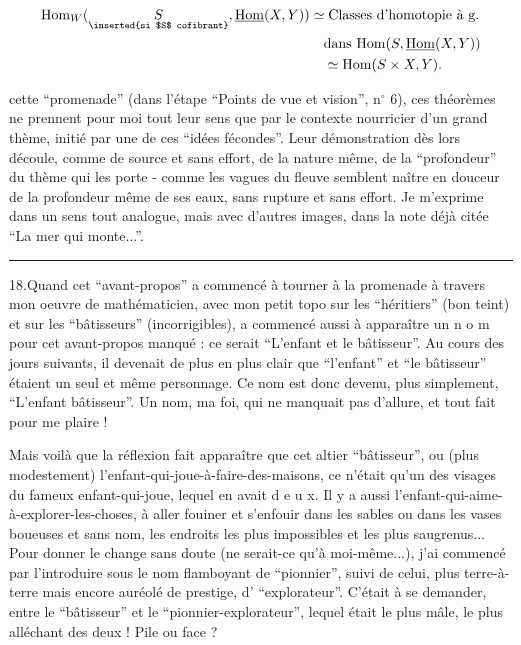 \[
\begin{aligned}
\mathrm{Hom}_W(\underset{\text{\scriptsize\inserted{si $S$ cofibrant}}}{S},\underline{\mathrm{Hom}}(X,Y))
 &\simeq \text{Classes d'homotopie à g.}\\
 &\quad\text{dans }\mathrm{Hom}(S,\underline{\mathrm{Hom}}(X,Y))\\
 &\quad\simeq\mathrm{Hom}(S\times X,Y).
\end{aligned}
\]

cette ``promenade'' (dans l'étape ``Points de vue et vision'', n$^\circ$ 6), ces théorèmes ne prennent pour moi tout leur sens que par le contexte nourricier d'un grand thème, initié par une de ces ``idées fécondes''. Leur démonstration dès lors découle, comme de source et sans effort, de la nature même, de la ``profondeur'' du thème qui les porte - comme les vagues du fleuve semblent naître en douceur de la profondeur même de ses eaux, sans rupture et sans effort. Je m'exprime dans un sens tout analogue, mais avec d'autres images, dans la note déjà citée ``La mer qui monte...''.

\noindent\rule{2.1cm}{0.4pt}

18.\quad Quand cet ``avant-propos'' a commencé à tourner à la promenade à travers mon oeuvre de mathématicien, avec mon petit topo sur les ``héritiers'' (bon teint) et sur les ``bâtisseurs'' (incorrigibles), a commencé aussi à apparaître un n o m pour cet avant-propos manqué : ce serait ``L'enfant et le bâtisseur''. Au cours des jours suivants, il devenait de plus en plus clair que ``l'enfant'' et ``le bâtisseur'' étaient un seul et même personnage. Ce nom est donc devenu, plus simplement, ``L'enfant bâtisseur''. Un nom, ma foi, qui ne manquait pas d'allure, et tout fait pour me plaire !

Mais voilà que la réflexion fait apparaître que cet altier ``bâtisseur'', ou (plus modestement) l'enfant-qui-joue-à-faire-des-maisons, ce n'était qu'un des visages du fameux enfant-qui-joue, lequel en avait d e u x. Il y a aussi l'enfant-qui-aime-à-explorer-les-choses, à aller fouiner et s'enfouir dans les sables ou dans les vases boueuses et sans nom, les endroits les plus impossibles et les plus saugrenus... Pour donner le change sans doute (ne serait-ce qu'à moi-même...), j'ai commencé par l'introduire sous le nom flamboyant de ``pionnier'', suivi de celui, plus terre-à-terre mais encore auréolé de prestige, d' ``explorateur''. C'était à se demander, entre le ``bâtisseur'' et le ``pionnier-explorateur'', lequel était le plus mâle, le plus alléchant des deux ! Pile ou face ?

